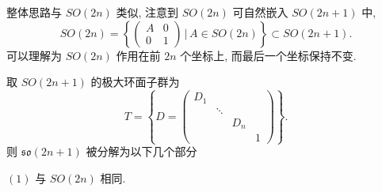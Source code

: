 \begin{example}[奇数阶特殊正交群 $SO(2n+1)$]
    整体思路与 $SO(2n)$ 类似, 注意到 $SO(2n)$ 可自然嵌入 $SO(2n+1)$ 中,
    \begin{equation*}
        SO(2n) = \left\{
        \begin{pmatrix}
            A & 0 \\
            0 & 1
        \end{pmatrix}\,\Bigg|\, A\in SO(2n)\right\}
        \subset SO(2n+1).
    \end{equation*}
    可以理解为 $SO(2n)$ 作用在前 $2n$ 个坐标上, 而最后一个坐标保持不变.

    取 $SO(2n+1)$ 的极大环面子群为
    \begin{equation*}
        T = \left\{ D = 
        \begin{pmatrix}
            D_1 & & & \\
            & \ddots & & \\
            & & D_n & \\
            & & & 1
        \end{pmatrix} \right\}.
    \end{equation*}
    则 $\mathfrak{so}(2n+1)$ 被分解为以下几个部分

    \noindent $(1)$
    与 $SO(2n)$ 相同.


\end{example}
